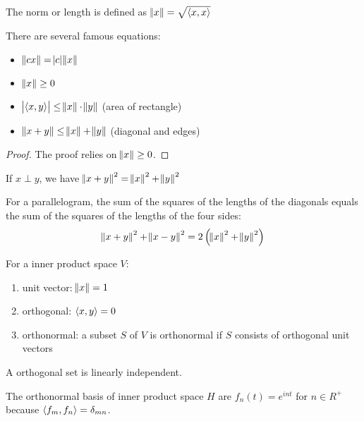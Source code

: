 \begin{definition}[Norm]
    The norm or length is defined as $\norm{x} = \sqrt{\left\langle \displaystyle x, x \right\rangle}$    
\end{definition}


There are several famous equations:
\begin{itemize}
    \item $\norm{cx} = \abs{c} \norm{x}$
    \item $\norm{x} \geq 0$
    \item $\abs{\left\langle \displaystyle x, y \right\rangle} \leq \norm{x} \cdot \norm{y}$ (area of rectangle)
    \item $\norm{x+y} \leq \norm{x} + \norm{y}$ (diagonal and edges)
\end{itemize}
\begin{proof}
    The proof relies on $\norm{x} \geq 0$.
\end{proof}




\begin{theorem}
    If $x \perp y$, we have $\norm{x+y}^2 = \norm{x}^2 + \norm{y}^2$    
\end{theorem}

\begin{theorem}
    For a parallelogram, the sum of the squares of the lengths of the diagonals equals the sum of the squares of the lengths of the four sides:
    \begin{equation}
        \norm{x + y}^2 + \norm{x-y}^2 = 2 \left(\norm{x}^2 + \norm{y}^2\right)
    \end{equation}    
\end{theorem}


\begin{definition}
    For a inner product space $V$:
    \begin{enumerate}
        \item unit vector: $\norm{x} =1$
        \item orthogonal: $\left\langle \displaystyle x, y \right\rangle = 0$
        \item orthonormal: a subset $S$ of $V$ is orthonormal if $S$ consists of orthogonal unit vectors
    \end{enumerate}
\end{definition}

A orthogonal set is linearly independent.

The orthonormal basis of inner product space $H$ are $f_n(t) = e^{int}$ for $n \in R^+$ because $\left\langle \displaystyle f_m, f_n \right\rangle = \delta_{mn} $.

